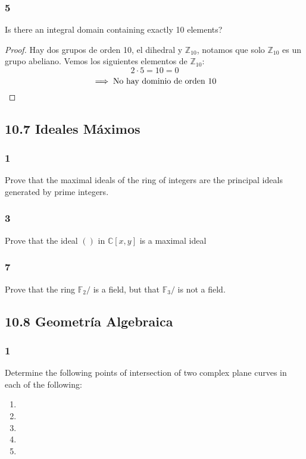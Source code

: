 \documentclass[11pt]{article}
\newcommand{\set}[1]{\mathbb{#1}}
\theoremstyle{definition}
\begin{document}
        \subsubsection{5}
        Is there an integral domain containing exactly 10 elements?
        \begin{proof}
            Hay dos grupos de orden 10, el dihedral y $\set{Z}_{10}$, notamos que solo $\set{Z}_{10}$ es un grupo abeliano. Vemos los siguientes elementos de $\set{Z}_{10}$:
            \[2\cdot 5=10=0\]
            \[\implies \textrm{No hay dominio de orden 10}\qedhere\]
        \end{proof}

        \subsection{10.7 Ideales Máximos}
        \subsubsection{1}
        Prove that the maximal ideals of the ring of integers are the principal ideals generated by prime integers.

        \subsubsection{3}
        Prove that the ideal $()$ in $\set{C}[x,y]$ is a maximal ideal

        \subsubsection{7}
        Prove that the ring $\set{F}_2/$ is a field, but that $\set{F}_3/$ is not a field.

        \subsection{10.8 Geometría Algebraica}
        \subsubsection{1}
        Determine the following points of intersection of two complex plane curves in each of the following:
        \begin{enumerate}[label=\textbf{(\alph*)}]
            \item

            \item

            \item

            \item

            \item
        \end{enumerate}
\end{document}
